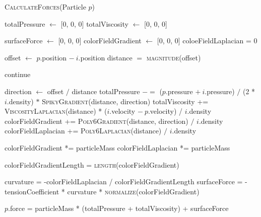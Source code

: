 \documentclass[a4paper, 12pt]{article}
\begin{document}
    \begin{algorithm}[H]
        \caption{\textsc{CalculateForces}(Particle $p$)}

        \begin{algorithmic}[1]
            \State totalPressure $\gets$ [0, 0, 0]
            \State totalViscosity $\gets$ [0, 0, 0]

            \State surfaceForce $\gets$ [0, 0, 0]
            \State colorFieldGradient $\gets$ [0, 0, 0]
            \State coloeFieldLaplacian = 0

                \State offset $\gets$ $p$.position $-\ i$.position
                \State distance $=$ \textsc{magnitude}(offset)

                    continue
                \EndIf

                \State direction $\gets$ offset $/$ distance
                \State totalPressure $-=$ ($p$.pressure $+\ i$.pressure) $/$ (2 * $i$.density) $*$ \textsc{SpikyGradient}(distance, direction)
                \State totalViscosity += \textsc{ViscosityLaplacian}(distance) *
                \Statex \hspace{\algorithmicindent} ($i$.velocity $-\ p$.velocity) / $i$.density
                \State colorFieldGradient += \textsc{Poly6Gradient}(distance, direction) \Statex \hspace{\algorithmicindent} $/$ $i$.density
                \State colorFieldLaplacian += \textsc{Poly6Laplacian}(distance) $/$ $i$.density
            \EndFor

            \State colorFieldGradient *= particleMass
            \State colorFieldLaplacian *= particleMass

            \State colorFieldGradientLength = \textsc{length}(colorFieldGradient)

                \State curvature = -colorFieldLaplacian / colorFieldGradientLength
                \State surfaceForce = -tensionCoefficient * curvature \Statex \hspace{\algorithmicindent} * \textsc{normalize}(colorFieldGradient)
            \EndIf

            \State $p$.force = particleMass * (totalPressure + totalViscosity) + surfaceForce
        \end{algorithmic}

    \end{algorithm}
\end{document}
